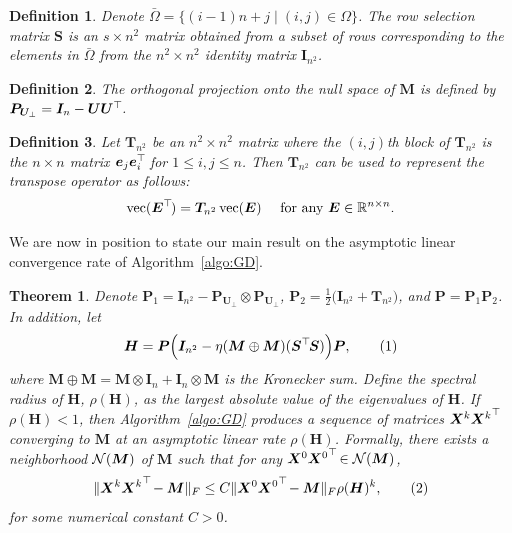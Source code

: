 \documentclass{article}
\def\R{{\mathbb R}}
\def\N{{\cal N}}
\newtheorem{definition}{Definition}
\newtheorem{theorem}{Theorem}
\newcommand{\norm}[1]{\|#1\|} %
\newcommand\numberthis{\addtocounter{equation}{1}\tag{\theequation}}
\DeclareMathOperator*{\vect}{vec}
\newcommand{\topnew}{\top \hspace{-0.05cm}}
\begin{document}
\begin{definition} \label{def:S}
Denote $\bar{\Omega} = \{ (i-1)n+j \mid (i,j) \in \Omega \}$. 
The row selection matrix $\bm S$ is an ${s \times n^2}$ matrix obtained from a subset of rows corresponding to the elements in $\bar{\Omega}$ from the $n^2 \times n^2$ identity matrix $\bm I_{n^2}$.
\end{definition}

\begin{definition} \label{def:PU}
The orthogonal projection onto the null space of $\bm M$ is defined by $\bm P_{\bm U_\perp} = \bm I_n - \bm U \bm U^\topnew$. 
\end{definition}

\begin{definition} \label{def:T}
Let $\bm T_{n^2}$ be an $n^2 \times n^2$ matrix where the $(i,j)$th block of $\bm T_{n^2}$ is the $n\times n$ matrix $\bm e_j \bm e_i^\topnew$ for $1 \le i,j \le n$. Then $\bm T_{n^2}$ can be used to represent the transpose operator as follows:
\begin{align*}
    \vect(\bm E^\topnew) = \bm T_{n^2} \vect(\bm E) \quad \text{ for any } \bm E \in \R^{n \times n} .
\end{align*}
\end{definition}
We are now in position to state our main result on the asymptotic linear convergence rate of Algorithm~\ref{algo:GD}.
\begin{theorem}
\label{theo:GD}
Denote $\bm P_1 = \bm I_{n^2} - \bm P_{\bm U_\perp} \otimes \bm P_{\bm U_\perp}$, $\bm P_2 = \frac{1}{2} \bigl(\bm I_{n^2} + \bm T_{n^2}\bigr)$, and $\bm P = \bm P_1 \bm P_2$. In addition, let
\begin{align*}
    \bm H = \bm P \Bigl( \bm I_{n^2} - \eta (\bm M \oplus \bm M) (\bm S^\topnew \bm S) \Bigr) \bm P , \numberthis \label{equ:H}
\end{align*}
where $\bm M \oplus \bm M = \bm M \otimes \bm I_n + \bm I_n \otimes \bm M$ is the Kronecker sum. Define the spectral radius of ${\bm H}$, $\rho(\bm H)$, as the largest absolute value of the eigenvalues of $\bm H$.
If $\rho(\bm H)<1$, then Algorithm~\ref{algo:GD} produces a sequence of matrices $\bm X^k {\bm X^k}^\topnew$ converging to $\bm M$ at an asymptotic linear rate $\rho(\bm H)$.
Formally, there exists a neighborhood $\N(\bm M)$ of $\bm M$ such that for any $\bm X^0 {\bm X^0}^\topnew \in \N(\bm M)$,
\begin{align*}
    \norm{\bm X^k {\bm X^k}^\topnew - \bm M}_F \leq C \norm{\bm X^0 {\bm X^0}^\topnew - \bm M}_F \rho(\bm H)^k, \numberthis \label{equ:XXM}
\end{align*}
for some numerical constant $C>0$.
\end{theorem}
\end{document}

